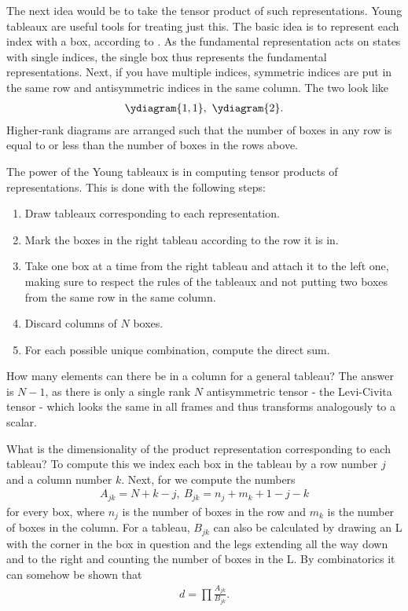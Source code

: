 The next idea would be to take the tensor product of such representations. Young tableaux are useful tools for treating just this. The basic idea is to represent each index with a box, according to \ytableaushort{{}}. As the fundamental representation acts on states with single indices, the single box thus represents the fundamental representations. Next, if you have multiple indices, symmetric indices are put in the same row and antisymmetric indices in the same column. The two look like
\begin{align*}
	\ydiagram{1, 1},\ \ydiagram{2}.
\end{align*}
Higher-rank diagrams are arranged such that the number of boxes in any row is equal to or less than the number of boxes in the rows above.

The power of the Young tableaux is in computing tensor products of representations. This is done with the following steps:
\begin{enumerate}
	\item Draw tableaux corresponding to each representation.
	\item Mark the boxes in the right tableau according to the row it is in.
	\item Take one box at a time from the right tableau and attach it to the left one, making sure to respect the rules of the tableaux and not putting two boxes from the same row in the same column.
	\item Discard columns of $N$ boxes.
	\item For each possible unique combination, compute the direct sum.
\end{enumerate}

How many elements can there be in a column for a general  tableau? The answer is $N - 1$, as there is only a single rank $N$ antisymmetric tensor - the Levi-Civita tensor - which looks the same in all frames and thus transforms analogously to a scalar.

What is the dimensionality of the product representation corresponding to each tableau? To compute this we index each box in the tableau by a row number $j$ and a column number $k$. Next, for  we compute the numbers
\begin{align*}
	A_{jk} = N + k - j,\ B_{jk} = n_{j} + m_{k}  + 1 - j - k
\end{align*}
for every box, where $n_{j}$ is the number of boxes in the row and $m_{k}$ is the number of boxes in the column. For a tableau, $B_{jk}$ can also be calculated by drawing an L with the corner in the box in question and the legs extending all the way down and to the right and counting the number of boxes in the L. By combinatorics it can somehow be shown that
\begin{align*}
	d = \prod\frac{A_{jk}}{B_{jk}}.
\end{align*}

